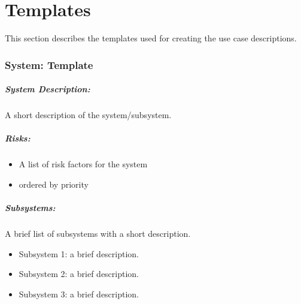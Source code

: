 
\appendix


\chapter{Templates}

This section describes the templates used for creating the use case descriptions.

\subsection{System: Template}
\label{System: Template}



\begin{figure} [htb]
	\centering
	\caption{}
	\label{fig:uc generic data}
\end{figure}


\paragraph{System Description:}
A short description of the system/subsystem.

\paragraph{Risks:}
\begin{itemize}
	\item A list of risk factors for the system
	\item ordered by priority
\end{itemize}


\paragraph{Subsystems:} A brief list of subsystems with a short description.

\begin{itemize}
	\item Subsystem 1: a brief description.
	\item Subsystem 2: a brief description.
	\item Subsystem 3: a brief description.
\end{itemize}


